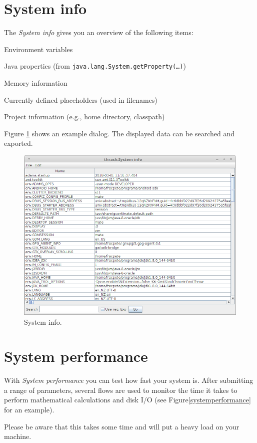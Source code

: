 \newpage
\section{System info}
The \textit{System info} gives you an overview of the following items:
\begin{tight_itemize}
  \item Environment variables
  \item Java properties (from \texttt{java.lang.System.getProperty(\ldots)})
  \item Memory information
  \item Currently defined placeholders (used in filenames)
  \item Project information (e.g., home directory, classpath)
\end{tight_itemize}
Figure \ref{systeminfo} shows an example dialog. The displayed data can
be searched and exported.

\begin{figure}[htb]
  \centering
  \includegraphics[width=12.0cm]{images/systeminfo.png}
  \caption{System info.}
  \label{systeminfo}
\end{figure}

\newpage
\section{System performance}
With \textit{System performance} you can test how fast your system is. After
submitting a range of parameters, several flows are used to monitor the time
it takes to perform mathematical calculations and disk I/O (see
Figure\ref{systemperformance} for an example).

Please be aware that this takes some time and will put a heavy load on your
machine.

